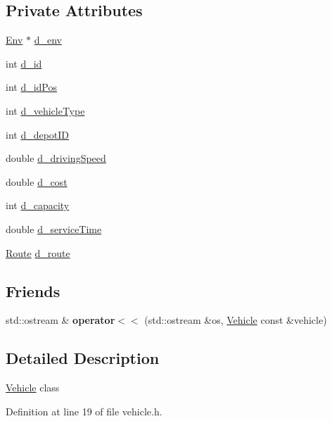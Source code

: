 \subsection*{Private Attributes}
\begin{DoxyCompactItemize}
\item 
\hyperlink{class_env}{Env} $\ast$ \hyperlink{class_vehicle_ac747e63cc697d1f8690d5ab4204840c4}{d\+\_\+env}
\item 
int \hyperlink{class_vehicle_ac43dc59528652696b3db319ef52f8185}{d\+\_\+id}
\item 
int \hyperlink{class_vehicle_a058ff58ef59467d28d21a529731af3e0}{d\+\_\+id\+Pos}
\item 
int \hyperlink{class_vehicle_af140a0f32589d5582cce381c1d2e1d73}{d\+\_\+vehicle\+Type}
\item 
int \hyperlink{class_vehicle_a6a86e014f7441ef89165c7e5ce47c1b5}{d\+\_\+depot\+ID}
\item 
double \hyperlink{class_vehicle_ace0ade1b8f4eed589c9e6c3649fb4ec3}{d\+\_\+driving\+Speed}
\item 
double \hyperlink{class_vehicle_a62e678a6dec05635fc5f87f5a3a239f3}{d\+\_\+cost}
\item 
int \hyperlink{class_vehicle_aaa97b9878e02637eaddc2ff6510e45b2}{d\+\_\+capacity}
\item 
double \hyperlink{class_vehicle_a0e6c7fd93b28501975e8c8144b6da1d7}{d\+\_\+service\+Time}
\item 
\hyperlink{class_route}{Route} \hyperlink{class_vehicle_a423d1aa2a6ba43debf87f85d5b30bf29}{d\+\_\+route}
\end{DoxyCompactItemize}
\subsection*{Friends}
\begin{DoxyCompactItemize}
\item 
\mbox{\label{class_vehicle_a03fb689e9f7599db1bb3e86d7b587998}} 
std\+::ostream \& {\bfseries operator$<$$<$} (std\+::ostream \&os, \hyperlink{class_vehicle}{Vehicle} const \&vehicle)
\end{DoxyCompactItemize}


\subsection{Detailed Description}
\hyperlink{class_vehicle}{Vehicle} class 

Definition at line 19 of file vehicle.\+h.




